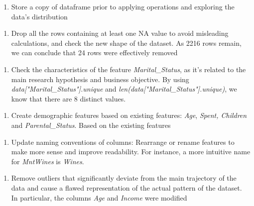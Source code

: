 \documentclass[11pt]{article}
\begin{document}
\vspace{1\baselineskip}
\begin{enumerate}
	\item Store a copy of dataframe prior to applying operations and exploring the data’s distribution

\end{enumerate}
\vspace{1\baselineskip}
\begin{enumerate}
	\item Drop all the rows containing at least one NA value to avoid misleading calculations, and check the new shape of the dataset. As 2216 rows remain, we can conclude that 24 rows were effectively removed

\end{enumerate}
\vspace{1\baselineskip}
\begin{enumerate}
	\item Check the characteristics of the feature \textit{Marital\_Status}, as it’s related to the main research hypothesis and business objective. By using \textit{data["Marital\_Status"].unique} and \textit{len(data["Marital\_Status"].unique)}, we know that there are 8 distinct values.

\end{enumerate}
\vspace{1\baselineskip}
\begin{enumerate}
	\item Create demographic features based on existing features: \textit{Age}, \textit{Spent, Children} and \textit{Parental\_Status}. Based on the existing features

\end{enumerate}
\vspace{1\baselineskip}
\begin{enumerate}
	\item Update naming conventions of columns: Rearrange or rename features to make more sense and improve readability. For instance, a more intuitive name for \textit{MntWines} is \textit{Wines}.

\end{enumerate}
\vspace{1\baselineskip}
\begin{enumerate}
	\item Remove outliers that significantly deviate from the main trajectory of the data and cause a flawed representation of the actual pattern of the dataset. In particular, the columns \textit{Age} and \textit{Income} were modified

\end{enumerate}
\end{document}
